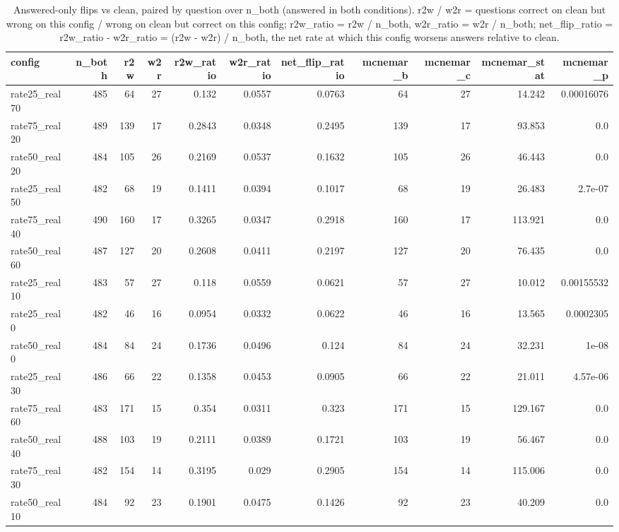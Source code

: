 \documentclass[11pt]{article}
\begin{document}
\begin{table}[H]
\centering
\caption{Answered-only flips vs clean, paired by question over n\_both (answered in both conditions). r2w / w2r = questions correct on clean but wrong on this config / wrong on clean but correct on this config; r2w\_ratio = r2w / n\_both, w2r\_ratio = w2r / n\_both; net\_flip\_ratio = r2w\_ratio - w2r\_ratio = (r2w - w2r) / n\_both, the net rate at which this config worsens answers relative to clean.}
\small
\begin{adjustbox}{max width=\textwidth}
\begin{tabular}{lrrrrrrrrrr}
\toprule
\textbf{config} & \textbf{n\_both} & \textbf{r2w} & \textbf{w2r} & \textbf{r2w\_ratio} & \textbf{w2r\_ratio} & \textbf{net\_flip\_ratio} & \textbf{mcnemar\_b} & \textbf{mcnemar\_c} & \textbf{mcnemar\_stat} & \textbf{mcnemar\_p} \\
\midrule
rate25\_real70 & 485 & 64 & 27 & 0.132 & 0.0557 & 0.0763 & 64 & 27 & 14.242 & 0.00016076 \\
rate75\_real20 & 489 & 139 & 17 & 0.2843 & 0.0348 & 0.2495 & 139 & 17 & 93.853 & 0.0 \\
rate50\_real20 & 484 & 105 & 26 & 0.2169 & 0.0537 & 0.1632 & 105 & 26 & 46.443 & 0.0 \\
rate25\_real50 & 482 & 68 & 19 & 0.1411 & 0.0394 & 0.1017 & 68 & 19 & 26.483 & 2.7e-07 \\
rate75\_real40 & 490 & 160 & 17 & 0.3265 & 0.0347 & 0.2918 & 160 & 17 & 113.921 & 0.0 \\
rate50\_real60 & 487 & 127 & 20 & 0.2608 & 0.0411 & 0.2197 & 127 & 20 & 76.435 & 0.0 \\
rate25\_real10 & 483 & 57 & 27 & 0.118 & 0.0559 & 0.0621 & 57 & 27 & 10.012 & 0.00155532 \\
rate25\_real0 & 482 & 46 & 16 & 0.0954 & 0.0332 & 0.0622 & 46 & 16 & 13.565 & 0.0002305 \\
rate50\_real0 & 484 & 84 & 24 & 0.1736 & 0.0496 & 0.124 & 84 & 24 & 32.231 & 1e-08 \\
rate25\_real30 & 486 & 66 & 22 & 0.1358 & 0.0453 & 0.0905 & 66 & 22 & 21.011 & 4.57e-06 \\
rate75\_real60 & 483 & 171 & 15 & 0.354 & 0.0311 & 0.323 & 171 & 15 & 129.167 & 0.0 \\
rate50\_real40 & 488 & 103 & 19 & 0.2111 & 0.0389 & 0.1721 & 103 & 19 & 56.467 & 0.0 \\
rate75\_real30 & 482 & 154 & 14 & 0.3195 & 0.029 & 0.2905 & 154 & 14 & 115.006 & 0.0 \\
rate50\_real10 & 484 & 92 & 23 & 0.1901 & 0.0475 & 0.1426 & 92 & 23 & 40.209 & 0.0 \\

\end{tabular}
\end{adjustbox}
\end{table}
\end{document}
